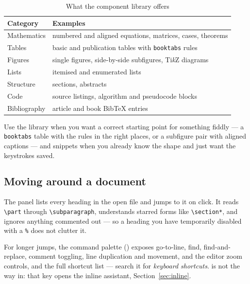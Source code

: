\begin{table}[htbp]
  \centering
  \caption{What the component library offers}
  \label{tab:components}
  \begin{tabular}{ll}
    \toprule
    \textbf{Category} & \textbf{Examples} \\
    \midrule
    Mathematics        & numbered and aligned equations, matrices, cases, theorems \\
    Tables             & basic and publication tables with \texttt{booktabs} rules \\
    Figures            & single figures, side-by-side subfigures, Ti\emph{k}Z diagrams \\
    Lists              & itemised and enumerated lists \\
    Structure          & sections, abstracts \\
    Code               & source listings, algorithm and pseudocode blocks \\
    Bibliography       & article and book Bib\TeX{} entries \\
    \bottomrule
  \end{tabular}
\end{table}

Use the library when you want a correct starting point for something fiddly ---
a \texttt{booktabs} table with the rules in the right places, or a subfigure
pair with aligned captions --- and snippets when you already know the shape and
just want the keystrokes saved.

\subsection{Moving around a document}

The  panel lists every heading in the open file and jumps to it on
click. It reads \verb|\part| through \verb|\subparagraph|, understands starred
forms like \verb|\section*|, and ignores anything commented out --- so a
heading you have temporarily disabled with a \texttt{\%} does not clutter it.

For longer jumps, the command palette () exposes go-to-line,
find, find-and-replace, comment toggling, line duplication and movement, and
the editor zoom controls, and the full shortcut list --- search it for
\emph{keyboard shortcuts}.  is not the way in: that key opens the
inline assistant, Section~\ref{sec:inline}.

